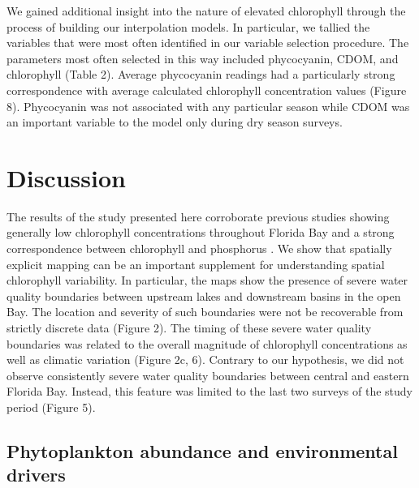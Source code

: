 We gained additional insight into the nature of elevated chlorophyll through the process of building our interpolation models. In particular, we tallied the variables that were most often identified in our variable selection procedure. The parameters most often selected in this way included phycocyanin, CDOM, and chlorophyll (Table 2). Average phycocyanin readings had a particularly strong correspondence with average calculated chlorophyll concentration values (Figure 8). Phycocyanin was not associated with any particular season while CDOM was an important variable to the model only during dry season surveys.

\section{Discussion}
\label{discussion}

The results of the study presented here corroborate previous studies showing generally low chlorophyll concentrations throughout Florida Bay and a strong correspondence between chlorophyll and phosphorus \citep{fourqurean1993process, phlips_spatial_1996}. We show that spatially explicit mapping can be an important supplement for understanding spatial chlorophyll variability. In particular, the maps show the presence of severe water quality boundaries between upstream lakes and downstream basins in the open Bay. The location and severity of such boundaries were not be recoverable from strictly discrete data (Figure 2). The timing of these severe water quality boundaries was related to the overall magnitude of chlorophyll concentrations as well as climatic variation (Figure 2c, 6). Contrary to our hypothesis, we did not observe consistently severe water quality boundaries between central and eastern Florida Bay. Instead, this feature was limited to the last two surveys of the study period (Figure 5).

\subsection{Phytoplankton abundance and environmental drivers}
\label{phytoabund}


